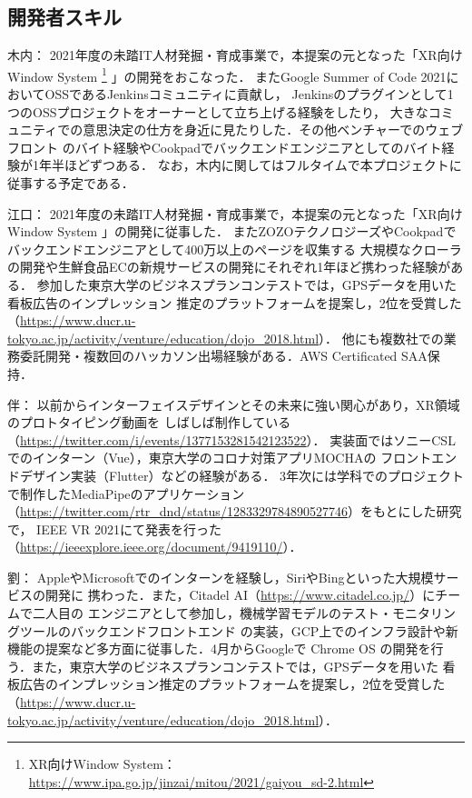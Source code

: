 \subsection{開発者スキル}

木内：
2021年度の未踏IT人材発掘・育成事業で，本提案の元となった「XR向けWindow System
\footnote{XR向けWindow System： \url{https://www.ipa.go.jp/jinzai/mitou/2021/gaiyou_sd-2.html}}
」の開発をおこなった．
またGoogle Summer of Code 2021においてOSSであるJenkinsコミュニティに貢献し，
Jenkinsのプラグインとして1つのOSSプロジェクトをオーナーとして立ち上げる経験をしたり，
大きなコミュニティでの意思決定の仕方を身近に見たりした．その他ベンチャーでのウェブフロント
のバイト経験やCookpadでバックエンドエンジニアとしてのバイト経験が1年半ほどずつある．
なお，木内に関してはフルタイムで本プロジェクトに従事する予定である．

江口：
2021年度の未踏IT人材発掘・育成事業で，本提案の元となった「XR向けWindow System
\footnotemark[9]
」の開発に従事した．
またZOZOテクノロジーズやCookpadでバックエンドエンジニアとして400万以上のページを収集する
大規模なクローラの開発や生鮮食品ECの新規サービスの開発にそれぞれ1年ほど携わった経験がある．
参加した東京大学のビジネスプランコンテストでは，GPSデータを用いた看板広告のインプレッション
推定のプラットフォームを提案し，2位を受賞した
（\url{https://www.ducr.u-tokyo.ac.jp/activity/venture/education/dojo_2018.html}）．
他にも複数社での業務委託開発・複数回のハッカソン出場経験がある．AWS Certificated SAA保持．

伴：
以前からインターフェイスデザインとその未来に強い関心があり，XR領域のプロトタイピング動画を
しばしば制作している（\url{https://twitter.com/i/events/1377153281542123522}）．
実装面ではソニーCSLでのインターン（Vue），東京大学のコロナ対策アプリMOCHAの
フロントエンドデザイン\/実装（Flutter）などの経験がある．
3年次には学科でのプロジェクトで制作したMediaPipeのアプリケーション
（\url{https://twitter.com/rtr_dnd/status/1283329784890527746}）をもとにした研究で，
IEEE VR 2021にて発表を行った（\url{https://ieeexplore.ieee.org/document/9419110/}）．

劉：
AppleやMicrosoftでのインターンを経験し，SiriやBingといった大規模サービスの開発に
携わった．また，Citadel AI（\url{https://www.citadel.co.jp/}）にチームで二人目の
エンジニアとして参加し，機械学習モデルのテスト・モニタリングツールのバックエンド\/フロントエンド
の実装，GCP上でのインフラ設計や新機能の提案など多方面に従事した．4月からGoogleで
Chrome OS の開発を行う．また，東京大学のビジネスプランコンテストでは，GPSデータを用いた
看板広告のインプレッション推定のプラットフォームを提案し，2位を受賞した
（\url{https://www.ducr.u-tokyo.ac.jp/activity/venture/education/dojo_2018.html}）．

